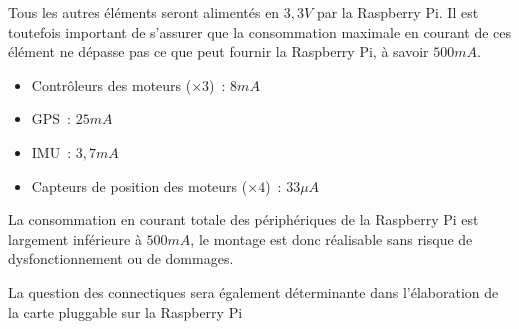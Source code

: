Tous les autres éléments seront alimentés en $3,3V$ par la Raspberry Pi. Il est toutefois important de s'assurer que la consommation maximale en courant de ces élément ne dépasse pas ce que peut fournir la Raspberry Pi, à savoir $500mA$.
\begin{itemize}[label=$\bullet$]
	\item Contrôleurs des moteurs ($\times 3$)~: $8mA$
	\item GPS~: $25mA$
	\item IMU~: $3,7mA$
	\item Capteurs de position des moteurs ($\times 4$)~: $33\mu A$
	\end{itemize}

\vspace{1cm}

La consommation en courant totale des périphériques de la Raspberry Pi est largement inférieure à $500mA$, le montage est donc réalisable sans risque de dysfonctionnement ou de dommages.

\vspace{1cm}

La question des connectiques sera également déterminante dans l'élaboration de la carte pluggable sur la Raspberry Pi



